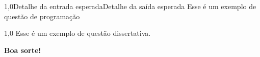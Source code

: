 \documentclass[
    12pt,     
    openright,
    twoside,  
    a4paper,  
    english,  
    brazil,   
]{memoir}
\begin{document}
\mainmatter



\begin{questaoProgramacao}{1,0}{Detalhe da entrada esperada}{Detalhe da saída esperada}
    Esse é um exemplo de questão de programação
\end{questaoProgramacao}



\begin{questaoDissertativa}{1,0}
    Esse é um exemplo de questão dissertativa.
\end{questaoDissertativa}



{\raggedleft \textbf{Boa sorte!}\par}
\end{document}
